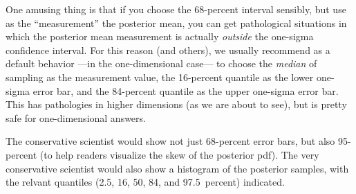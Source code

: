 \documentclass[12pt,twoside,pdftex]{article}
\begin{document}
One amusing thing is that if you choose the 68-percent interval sensibly,
  but use as the ``measurement'' the posterior mean,
  you can get pathological situations in which the posterior mean measurement
  is actually \emph{outside} the one-sigma confidence interval.
For this reason (and others), we usually recommend as a default behavior%
  ---in the one-dimensional case---%
  to choose the \emph{median} of sampling as the measurement value,
  the 16-percent quantile as the lower one-sigma error bar,
  and the 84-percent quantile as the upper one-sigma error bar.
This has pathologies in higher dimensions (as we are about to see),
  but is pretty safe for one-dimensional answers.

The conservative scientist would show not just 68-percent error bars,
  but also 95-percent
  (to help readers visualize the skew of the posterior pdf).
The very conservative scientist would also show a histogram
  of the posterior samples,
  with the relvant quantiles (2.5, 16, 50, 84, and 97.5~percent) indicated.
\end{document}
